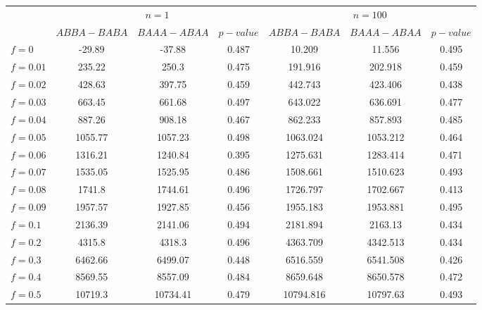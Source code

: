 \begin{tabular}{@{}lcccccc@{}}
\toprule
 & \multicolumn{3}{c}{$n=1$} & \multicolumn{3}{c}{$n=100$} \\
\cmidrule(lr){2-4} \cmidrule(lr){5-7}
 & $ABBA-BABA$ & $BAAA-ABAA$ & $p-value$ & $ABBA-BABA$ & $BAAA-ABAA$ & $p-value$ \\
\midrule
$f = 0$ & -29.89 & -37.88 & 0.487 & 10.209 & 11.556 & 0.495 \\
$f = 0.01$ & 235.22 & 250.3 & 0.475 & 191.916 & 202.918 & 0.459 \\
$f = 0.02$ & 428.63 & 397.75 & 0.459 & 442.743 & 423.406 & 0.438 \\
$f = 0.03$ & 663.45 & 661.68 & 0.497 & 643.022 & 636.691 & 0.477 \\
$f = 0.04$ & 887.26 & 908.18 & 0.467 & 862.233 & 857.893 & 0.485 \\
$f = 0.05$ & 1055.77 & 1057.23 & 0.498 & 1063.024 & 1053.212 & 0.464 \\
$f = 0.06$ & 1316.21 & 1240.84 & 0.395 & 1275.631 & 1283.414 & 0.471 \\
$f = 0.07$ & 1535.05 & 1525.95 & 0.486 & 1508.661 & 1510.623 & 0.493 \\
$f = 0.08$ & 1741.8 & 1744.61 & 0.496 & 1726.797 & 1702.667 & 0.413 \\
$f = 0.09$ & 1957.57 & 1927.85 & 0.456 & 1955.183 & 1953.881 & 0.495 \\
$f = 0.1$ & 2136.39 & 2141.06 & 0.494 & 2181.894 & 2163.13 & 0.434 \\
$f = 0.2$ & 4315.8 & 4318.3 & 0.496 & 4363.709 & 4342.513 & 0.434 \\
$f = 0.3$ & 6462.66 & 6499.07 & 0.448 & 6516.559 & 6541.508 & 0.426 \\
$f = 0.4$ & 8569.55 & 8557.09 & 0.484 & 8659.648 & 8650.578 & 0.472 \\
$f = 0.5$ & 10719.3 & 10734.41 & 0.479 & 10794.816 & 10797.63 & 0.493 \\
\bottomrule
\end{tabular}
